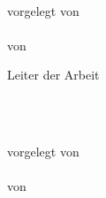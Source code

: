 \begin{titlepage}
  \begin{center}
    \thispagestyle{empty}
    \mbox{}
    {\bfseries\Huge \rtitle}
    \vspace{0.6in}
    {\bfseries\Large \rtypeofwork \\}
    \vspace{1.1in}

    {\large vorgelegt von} \\
    \vspace{0.1in}
    {\large \textbf \rauthor}\\
    \vspace{0.1in}
    {\large von \rhometown} \\
    \vspace{0.6in}
    
    \vspace{1.1in}
    {\large Leiter der Arbeit} \\
    \vspace{0.1in}
    {\large \textbf \rsupervisor} \\
    \vspace{0.6in}
    
    \large{\rschool}
    \vspace{0.6in}
  \end{center}
  \clearpage{\thispagestyle{empty}\cleardoublepage}
  \begin{center}
    \thispagestyle{empty}
    \mbox{}
    {\bfseries\Huge \rtitle}
    \vspace{0.6in}
    {\bfseries\Large \rtypeofwork \\}
    \vspace{0.6in}

    {\large vorgelegt von} \\
    \vspace{0.1in}
    {\large \textbf \rauthor}\\
    \vspace{0.1in}
    {\large von \rhometown} \\
    \vspace{0.6in}
    

\end{center}
\end{titlepage}
